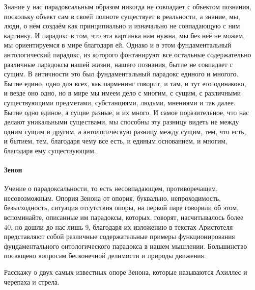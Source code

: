 Знание у нас парадоксальным образом никогда не
совпадает с объектом познания, поскольку объект сам в своей полноте существует в
реальности, а знание, мы, люди, о нём создаём как принципиально и изначально не
совпадающую с ним картинку. И парадокс в том, что эта картинка нам нужна, мы без
неё не можем, мы ориентируемся в мире благодаря ей. Однако и в этом
фундаментальный антологический парадокс, из которого фонтанируют все остальные
содержательно различные парадоксы нашей жизни, нашего познания, бытие не
совпадает с сущим. В античности это был фундаментальный парадокс единого и
многого. Бытие едино, одно для всех, как парменинг говорит, и там, и тут его
одинаково, и везде оно одно, но в мире мы имеем дело с многим, с сущим, с
различными существующими предметами, субстанциями, людьми, мнениями и так далее.
Бытие одно единое, а сущие разные, и их много. И самое поразительное, что нас
делают уникальными существами, мы способны эту разницу видеть не между одним
сущим и другим, а антологическую разницу между сущим, тем, что есть, и бытием,
тем, благодаря чему все есть, и единым основанием, и многим, благодаря ему
существующим. 

\paragraph{Зенон}
Учение о парадоксальности, то есть несовпадающем, противоречащем,
несовозможным. Опория Зенона от опория,
буквально, непроходимость, безысходность, ситуация отсутствия опоры, на первой
паре говорили об этом, вспоминайте, описанные им парадоксы, которых, говорят,
насчитывалось более 40, но дошли до нас лишь 9, благодаря их изложению в текстах
Аристотеля представляют собой различные содержательные примеры функционирования
фундаментального онтологического парадокса в нашем мышлении. Большинство
посвящено вопросам бесконечной делимости и природы движения. 

Расскажу о двух
самых известных опоре Зенона, которые называются Ахиллес и черепаха и стрела.

